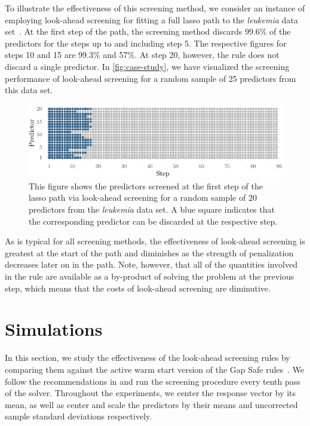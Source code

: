 \documentclass[b5paper,10pt,abstractoff,DIV=calc,headings=normal,twoside]{scrartcl}
\theoremstyle{plain}
\theoremstyle{definition}
\theoremstyle{remark}
\begin{document}
To illustrate the effectiveness of this screening method, we consider an
instance of employing look-ahead screening for fitting a full lasso path to the
\emph{leukemia} data set~\citep{golub1999}.  At the first step of the path, the
screening method discards 99.6\% of the predictors for the steps up to and
including step 5. The respective figures for steps 10 and 15 are 99.3\% and
57\%.  At step 20, however, the rule does not discard a single predictor.  In
\autoref{fig:case-study}, we have visualized the screening performance of
look-ahead screening for a random sample of 25 predictors from this data set.

\begin{figure}[hbtp]
  \centering
  \includegraphics{figures/casestudy.pdf}
  \caption{This figure shows the predictors screened at the first step of the
    lasso path via look-ahead screening for a random sample of
    20 predictors from the \emph{leukemia}
    data set. A blue square indicates that the corresponding predictor can
    be discarded at the respective step.\label{fig:case-study}}
\end{figure}

As is typical for all screening methods, the effectiveness of look-ahead
screening is greatest at the start of the path and diminishes as the strength
of penalization decreases later on in the path. Note, however, that all of the
quantities involved in the rule are available as a by-product of solving the
problem at the previous step, which means that the costs of look-ahead
screening are diminutive.

\section{Simulations}\label{seq:simulations}

In this section, we study the effectiveness of the look-ahead screening rules by
comparing them against the active warm start version of the Gap Safe
rules~\citep{fercoq2015,ndiaye2017}.  We follow the recommendations in
\citet{ndiaye2017} and run the screening procedure every tenth pass of the
solver.
Throughout the experiments, we center the response vector by its mean, as
well as center and scale the predictors by their means and uncorrected
sample standard deviations respectively.
\end{document}
